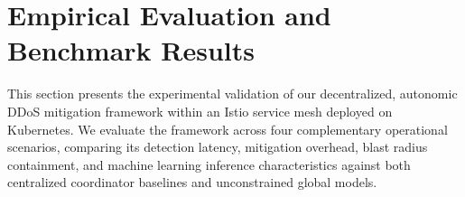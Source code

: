 
\section{Empirical Evaluation and Benchmark Results}
\label{sec:evaluation}

This section presents the experimental validation of our decentralized, autonomic DDoS mitigation framework within an Istio service mesh deployed on Kubernetes. We evaluate the framework across four complementary operational scenarios, comparing its detection latency, mitigation overhead, blast radius containment, and machine learning inference characteristics against both centralized coordinator baselines and unconstrained global models.







